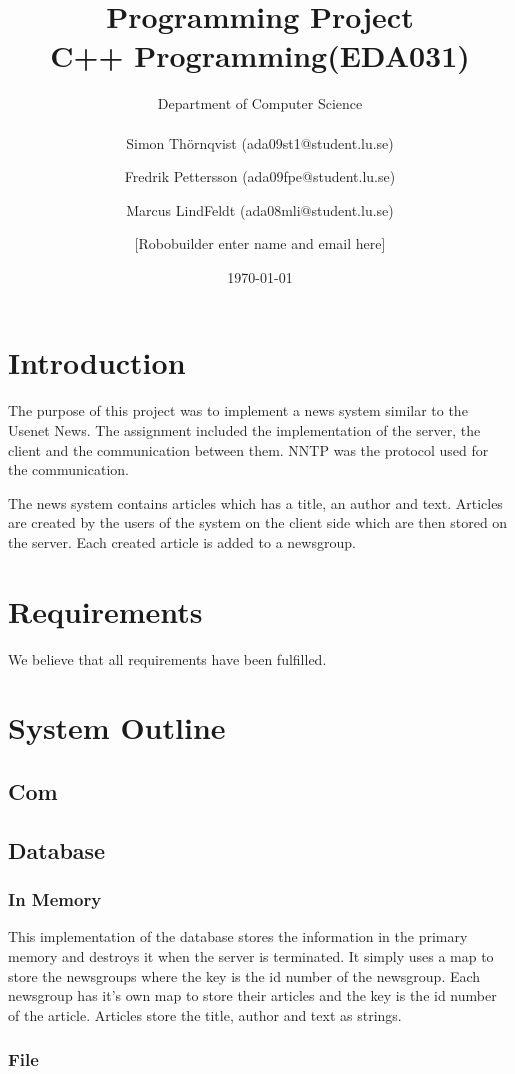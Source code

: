\documentclass[a4paper, titlepage]{article}
\title{
    Programming Project \\
    C++ Programming(EDA031)
}
\author{
        Department of Computer Science \\
            \\
        Simon Thörnqvist (ada09st1@student.lu.se)
            \and
        Fredrik Pettersson (ada09fpe@student.lu.se)
            \and
        Marcus LindFeldt (ada08mli@student.lu.se)
            \and
        [Robobuilder enter name and email here]
}
\date{\today}
\begin{document}
\maketitle

\section{Introduction}\label{introduction}
The purpose of this project was to implement a news system similar to the Usenet News. The assignment included the implementation of the server, the client and the communication between them. NNTP was the protocol used for the communication.

The news system contains articles which has a title, an author and text. Articles are created by the users of the system on the client side which are then stored on the server. Each created article is added to a newsgroup.

\section{Requirements}\label{requirements}
We believe that all requirements have been fulfilled.

\section{System Outline}\label{systemoutline}
\subsection{Com}

\subsection{Database}
\subsubsection{In Memory}
This implementation of the database stores the information in the primary memory and destroys it when the server is terminated. It simply uses a map to store the newsgroups where the key is the id number of the newsgroup. Each newsgroup has it's own map to store their articles and the key is the id number of the article. Articles store the title, author and text as strings.

\subsubsection{File}
\end{document}
